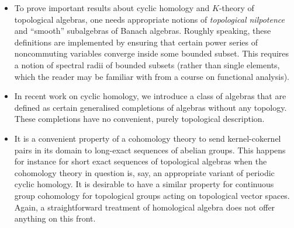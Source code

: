\begin{itemize}
\item To prove important results about cyclic homology and \(K\)-theory of topological algebras, one needs appropriate notions of \emph{topological nilpotence} and ``smooth'' subalgebras of Banach algebras. Roughly speaking, these  definitions are implemented by ensuring that certain power series of noncommuting variables converge inside some bounded subset. This requires a notion of spectral radii of bounded subsets (rather than single elements, which the reader may be familiar with from a course on functional analysis).

\item In recent work on cyclic homology, we introduce a class of algebras that are defined as certain generalised completions of algebras without any topology. These  completions have no convenient, purely topological description. 

\item It is a convenient property of a cohomology theory to send kernel-cokernel pairs in its domain to long-exact sequences of abelian groups. This happens for instance for short exact sequences of topological algebras when the cohomology theory in question is, say, an appropriate variant of periodic cyclic homology. It is desirable to have a similar property for continuous group cohomology for topological groups acting on topological vector spaces. Again, a straightforward treatment of homological algebra does not offer anything on this front.  
\end{itemize}